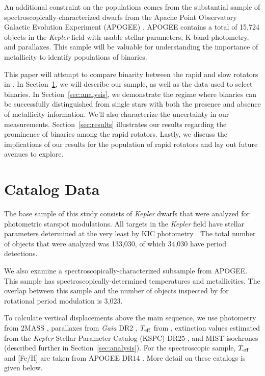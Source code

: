 \documentclass[manuscript]{aastex6}
\newcommand{\Kepler}{\mbox{\textit{Kepler}}}
\newcommand{\Gaia}{\mbox{\textit{Gaia}}}
\newcommand{\Teff}{\ensuremath{T_{\rm eff}}}
\begin{document}
An additional constraint on the populations comes from the substantial sample
of spectroscopically-characterized dwarfs from the Apache Point Observatory
Galactic Evolution Experiment (APOGEE) \citep{Majewski17}. APOGEE contains a 
total of 15,724 objects in the \Kepler{} field with usable stellar parameters,
K-band photometry, and parallaxes.  This sample will be valuable for 
understanding the importance of metallicity to identify populations of 
binaries.

This paper will attempt to compare binarity between the rapid and slow rotators 
in \citet{McQuillan14}. In Section~\ref{sec:data}, we will describe our 
sample, as well as the data used to select binaries. In Section~\ref{sec:analysis}, we demonstrate the regime where 
binaries can be successfully distinguished from single stars with both the 
presence and absence of metallicity information. We'll also characterize the 
uncertainty in our measurements. Section~\ref{sec:results} illustrates our 
results regarding the prominence of binaries among the rapid rotators. Lastly, 
we discuss the implications of our results for the population of rapid rotators 
and lay out future avenues to explore.

\section{Catalog Data}
\label{sec:data}

The base sample of this study consists of \Kepler{} dwarfs that were analyzed
for photometric starspot modulations. All targets in the \Kepler{} field have 
stellar parameters determined at the very least by KIC photometry 
\citep{Brown11}. The total number of objects that were analyzed was 133,030, 
of which 34,030 have period detections.

We also examine a spectroscopically-characterized subsample from APOGEE\@. 
This sample has spectroscopically-determined temperatures and metallicities. 
The overlap between this sample and the number of objects inspected by 
\citet{McQuillan14} for rotational period modulation is 3,023.

To calculate vertical displacements above the main sequence, we use photometry
from 2MASS \citep{Skrutskie06}, parallaxes from \Gaia{} DR2 \citep{Gaia18},
\Teff{} from \citet{Pinsonneault12}, extinction values estimated from the 
\Kepler{} Stellar Parameter Catalog (KSPC) DR25 \citep{Huber14,Mathur17}, and
MIST isochrones \citep{Choi16} (described further in
Section~\ref{sec:analysis}). For the spectroscopic sample, \Teff{} and [Fe/H] 
are taken from APOGEE DR14 \citep{Abolfathi18}. More detail on these catalogs 
is given below.
\end{document}
